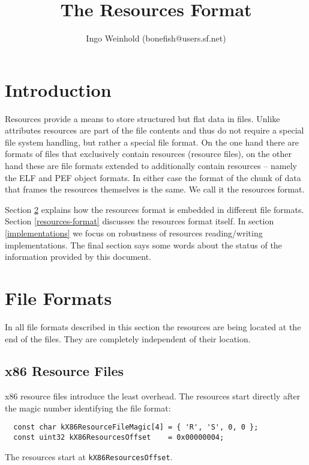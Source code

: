 \documentclass[12pt, a4paper]{article}
\newcommand{\code}[1]{{\tt #1}}
\newcommand{\codeblockbegin}{\begin{flushleft}\begin{minipage}{\textwidth}}
\newcommand{\codeblockend}{\end{minipage}\end{flushleft}}
\begin{document}
\sloppy

\title{The Resources Format}
\author{Ingo Weinhold (bonefish@users.sf.net)}

\maketitle
\tableofcontents


\section{Introduction}
\label{introduction}

Resources provide a means to store structured but flat data in files. Unlike
attributes resources are part of the file contents and thus do not require a
special file system handling, but rather a special file format.
On the one hand there are formats of files that exclusively contain resources
(resource files), on the other hand these are file formats extended to
additionally contain resources -- namely the ELF and PEF object formats.
In either case the format of the chunk of data that frames the resources
themselves is the same. We call it the resources format.

Section \ref{file-formats} explains how the resources format is embedded in
different file formats. Section \ref{resources-format} discusses the resources
format itself. In section \ref{implementations} we focus on robustness of
resources reading/writing implementations.
The final section says some words about the status of the information provided
by this document.



\section{File Formats}
\label{file-formats}

In all file formats described in this section the resources are being located
at the end of the files. They are completely independent of their location.


\subsection{x86 Resource Files}

x86 resource files introduce the least overhead. The resources start directly
after the magic number identifying the file format:
%
\codeblockbegin
\begin{verbatim}
  const char kX86ResourceFileMagic[4] = { 'R', 'S', 0, 0 };
  const uint32 kX86ResourcesOffset    = 0x00000004;
\end{verbatim}
\codeblockend
%
The resources start at \code{kX86ResourcesOffset}.
\end{document}
